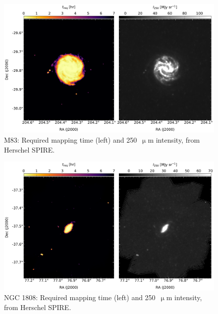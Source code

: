 \begin{figure}[!htbp]
\centering
\includegraphics[width=\textwidth]{figures/galaxies/m83}
\caption[~M83 required mapping time.]{M83: Required mapping time (left) and 250~$\upmu$m intensity, from Herschel SPIRE.}
\label{fig:m83}
\end{figure}

\begin{figure}[!htbp]
\centering
\includegraphics[width=\textwidth]{figures/galaxies/ngc1808}
\caption[~NGC 1808 required mapping time.]{NGC 1808: Required mapping time (left) and 250~$\upmu$m intensity, from Herschel SPIRE.}
\label{fig:ngc1808}
\end{figure}
